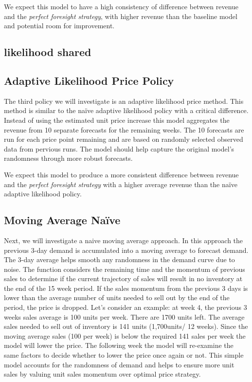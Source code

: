 \documentclass[11pt,a4paper]{article}
\begin{document}
We expect this model to have a high consistency of difference between revenue and the \emph{perfect foresight strategy}, with higher revenue than the baseline model and potential room for improvement.

\subsection{likelihood shared}

\subsection{Adaptive Likelihood Price Policy}
The third policy we will investigate is an adaptive likelihood price method. 
This method is similar to the naïve adaptive likelihood policy with a critical difference. 
Instead of using the estimated unit price increase this model aggregates the revenue from 10 separate forecasts for the remaining weeks. 
The 10 forecasts are run for each price point remaining and are based on randomly selected observed data from pervious runs.  
The model should help capture the original model’s randomness through more robust forecasts. 

We expect this model to produce a more consistent difference between revenue and the \emph{perfect foresight strategy} with a higher average revenue than the naïve adaptive likelihood policy.

\subsection{Moving Average Naïve}
Next, we will investigate a naive moving average approach. 
In this approach the previous 3-day demand is accumulated into a moving average to forecast demand.
The 3-day average helps smooth any randomness in the demand curve due to noise. 
The function considers the remaining time and the momentum of previous sales to determine if the current trajectory of sales will result in no inventory at the end of the 15 week period. 
If the sales momentum from the previous 3 days is lower than the average number of units needed to sell out by the end of the period, the price is dropped. 
Let’s consider an example: at week 4, the previous 3 weeks sales average is 100 units per week. There are 1700 units left. 
The average sales needed to sell out of inventory is 141 units (1,700units/ 12 weeks). 
Since the moving average sales (100 per week) is below the required 141 sales per week the model will lower the price. 
The following week the model will re-examine the same factors to decide whether to lower the price once again or not. 
This simple model accounts for the randomness of demand and helps to ensure more unit sales by valuing unit sales momentum over optimal price strategy.
\end{document}
